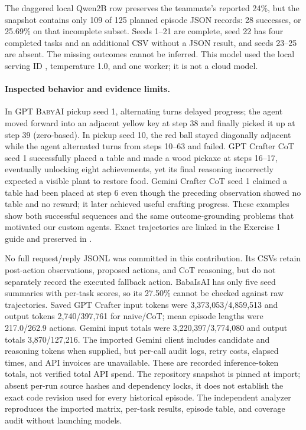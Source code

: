 \documentclass[11pt,a4paper]{article}
\newcommand{\BabyAI}{\textsc{BabyAI}}
\begin{document}
The daggered local Qwen2B row preserves the teammate's reported 24\%, but the snapshot contains only 109 of 125 planned episode JSON records: 28 successes, or 25.69\% on that incomplete subset. Seeds 1--21 are complete, seed 22 has four completed tasks and an additional CSV without a JSON result, and seeds 23--25 are absent. The missing outcomes cannot be inferred. This model used the local serving ID , temperature 1.0, and one worker; it is not a cloud model.

\paragraph{Inspected behavior and evidence limits.} In GPT \BabyAI{} pickup seed 1, alternating turns delayed progress; the agent moved forward into an adjacent yellow key at step 38 and finally picked it up at step 39 (zero-based). In pickup seed 10, the red ball stayed diagonally adjacent while the agent alternated turns from steps 10--63 and failed. GPT Crafter CoT seed 1 successfully placed a table and made a wood pickaxe at steps 16--17, eventually unlocking eight achievements, yet its final reasoning incorrectly expected a visible plant to restore food. Gemini Crafter CoT seed 1 claimed a table had been placed at step 6 even though the preceding observation showed no table and no reward; it later achieved useful crafting progress. These examples show both successful sequences and the same outcome-grounding problems that motivated our custom agents. Exact trajectories are linked in the Exercise 1 guide and preserved in .

No full request/reply JSONL was committed in this contribution. Its CSVs retain post-action observations, proposed actions, and CoT reasoning, but do not separately record the executed fallback action. BabaIsAI has only five seed summaries with per-task scores, so its 27.50\% cannot be checked against raw trajectories. Saved GPT Crafter input tokens were 3,373,053/4,859,513 and output tokens 2,740/397,761 for naive/CoT; mean episode lengths were 217.0/262.9 actions. Gemini input totals were 3,220,397/3,774,080 and output totals 3,870/127,216. The imported Gemini client includes candidate and reasoning tokens when supplied, but per-call audit logs, retry costs, elapsed times, and API invoices are unavailable. These are recorded inference-token totals, not verified total API spend. The repository snapshot is pinned at import; absent per-run source hashes and dependency locks, it does not establish the exact code revision used for every historical episode. The independent analyzer  reproduces the imported matrix, per-task results, episode table, and coverage audit without launching models.
\end{document}
